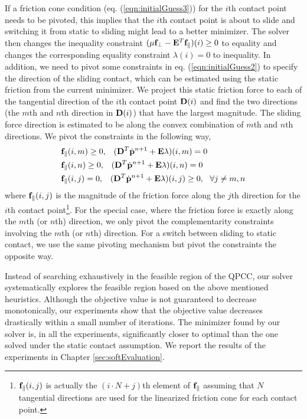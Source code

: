 If a friction cone condition (eq. (\ref{eqn:initialGuess3})) for the
$i$th contact point needs to be pivoted, this implies that the $i$th contact point is about to slide and switching it from static to sliding might lead to a better minimizer. The solver then changes the inequality constraint $(\mu \mathbf{f}_{\perp} - \mathbf{E}^T \mathbf{f}_{\parallel})(i)\geq 0$ to equality and changes the corresponding equality constraint $\lambda(i)=0$ to inequality. In addition, we need to pivot some constraints in eq. (\ref{eqn:initialGuess2}) to specify the direction of the sliding contact, which can be estimated using the static friction from the current minimizer. We project this static friction force to each of the tangential direction of the $i$th contact point $\mathbf{D}(i)$ and find the two directions (the $m$th and $n$th direction in $\mathbf{D}(i)$) that have the largest magnitude. The sliding force direction is estimated to be along the convex combination of $m$th and $n$th directions. We pivot the constraints in the following way,
\begin{align}
& \vc{f}_{\parallel}(i, m)\geq 0, \;\;\; (\vc{D}^T \dot{\vc{p}}^{n+1} + \vc{E} \lambda)(i, m) = 0 \nonumber \\
& \vc{f}_{\parallel}(i, n)\geq 0, \;\;\; (\vc{D}^T \dot{\vc{p}}^{n+1} + \vc{E} \lambda)(i, n) = 0\nonumber \\
& \vc{f}_{\parallel}(i, j) = 0, \;\;\;(\vc{D}^T \dot{\vc{p}}^{n+1} + \vc{E} \lambda)(i, j) \geq 0, ~~\forall j \neq m, n\nonumber
\label{eqn:staticSlidePivot}
\end{align}
where $\mathbf{f}_{\parallel}(i, j)$ is the magnitude of the friction force
along the $j$th direction for the $i$th contact
point\footnote{$\mathbf{f}_{\parallel}(i, j)$ is actually the $(i\cdot N+j)$th
element of $\mathbf{f}_{\parallel}$ assuming that $N$ tangential directions
are used for the linearized friction cone for each contact point.}. For
the special case, where the friction force is exactly along the $m$th (or
$n$th) direction, we only pivot the complementarity constraints involving
the $m$th (or $n$th) direction. For a switch between sliding to static
contact, we use the same pivoting mechanism but pivot the constraints the
opposite way.

Instead of searching exhaustively in the feasible region of the QPCC, our
solver systematically explores the feasible region based on the above
mentioned heuristics. Although the objective value is not guaranteed to
decrease monotonically, our experiments show that the objective value
decreases drastically within a small number of iterations. The minimizer
found by our solver is, in all the experiments, significantly closer to
optimal than the one solved under the static contact assumption. We report the
results of the experiments in Chapter \ref{sec:softEvaluation}.

